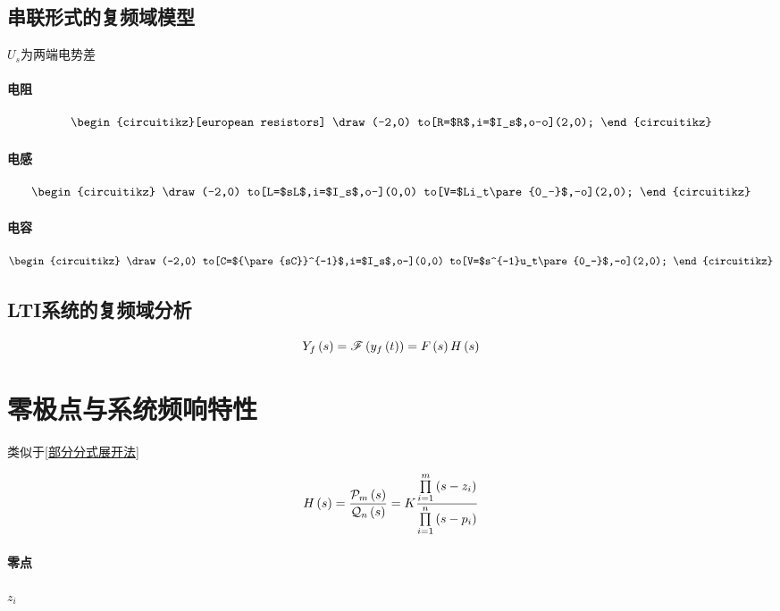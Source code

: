 \documentclass{article}
\begin{document}
\subsection{串联形式的复频域模型}

$U_s$为两端电势差

\paragraph{电阻}

\[\begin{circuitikz}[european resistors]
        \draw(-2,0)
        to[R=$R$,i=$I_s$,o-o](2,0);
    \end{circuitikz}\]

\paragraph{电感}

\[\begin{circuitikz}
        \draw(-2,0)
        to[L=$sL$,i=$I_s$,o-](0,0)
        to[V=$Li_t\pare{0_-}$,-o](2,0);
    \end{circuitikz}\]

\paragraph{电容}

\[\begin{circuitikz}
        \draw(-2,0)
        to[C=${\pare{sC}}^{-1}$,i=$I_s$,o-](0,0)
        to[V=$s^{-1}u_t\pare{0_-}$,-o](2,0);
    \end{circuitikz}\]

\subsection{LTI系统的复频域分析}

\[Y_f\left(s\right)=\mathscr F\left(y_f\left(t\right)\right)=F\left(s\right) H\left(s\right)\]

\section{零极点与系统频响特性}

类似于\ref{部分分式展开法}

\[H\left(s\right)=\frac{\mathcal P_m\left(s\right)}{\mathcal Q_n\left(s\right)}
    =K\frac{\prod\limits_{i=1}^m\left(s-z_i\right)}
    {\prod\limits_{i=1}^n\left(s-p_i\right)}\]

\paragraph{零点}$z_i$
\end{document}
